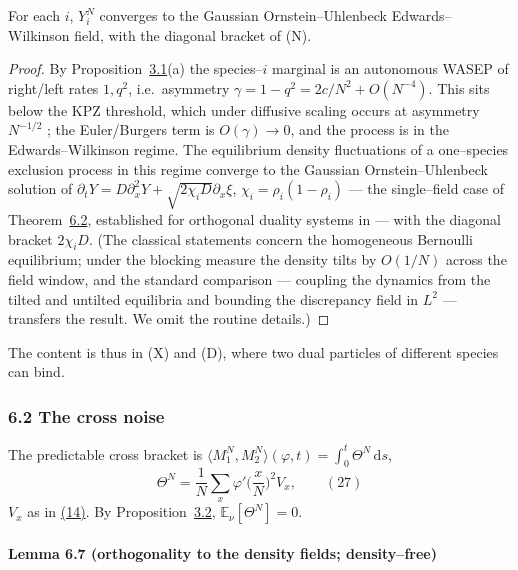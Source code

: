 \documentclass[11pt]{article}
\theoremstyle{plain}
\theoremstyle{definition}
\theoremstyle{remark}
\newcommand{\E}{\mathbb{E}}\newcommand{\PP}{\mathbb{P}}\newcommand{\dd}{\,\mathrm{d}}
\begin{document}
For each $i$, $Y_i^N$ converges to the Gaussian Ornstein--Uhlenbeck
Edwards--Wilkinson field, with the diagonal bracket of \textup{(N)}.
\par
\begin{proof}
By Proposition~\hyperref[prop_decouple]{3.1}(a) the species--$i$ marginal is an autonomous WASEP
of right/left rates $1,q^2$, i.e.\ asymmetry $\gamma=1-q^2=2c/N^2+O(N^{-4})$. This sits
below the KPZ threshold, which under diffusive scaling occurs at asymmetry $N^{-1/2}$
\cite{GJ}; the Euler/Burgers term is $O(\gamma)\to0$, and the process is in the
Edwards--Wilkinson regime. The equilibrium density fluctuations of a one--species
exclusion process in this regime converge to the Gaussian Ornstein--Uhlenbeck solution
of $\partial_tY=D\partial_x^2Y+\sqrt{2\chi_i D}\partial_x\xi$, $\chi_i=\rho_i(1-\rho_i)$
--- the single--field case of Theorem~\hyperref[thm_mp]{6.2}, established for orthogonal duality
systems in \cite{ACR2} --- with the diagonal bracket $2\chi_i D$. (The classical statements concern the homogeneous Bernoulli equilibrium;
under the blocking measure the density tilts by $O(1/N)$ across the field window, and
the standard comparison --- coupling the dynamics from the tilted and untilted
equilibria and bounding the discrepancy field in $L^2$ --- transfers the result. We
omit the routine details.)
\end{proof}

\noindent The content is thus in (X) and (D), where two dual particles of different
species can bind.

\subsubsection{6.2 The cross noise}
The predictable cross bracket is $\langle M_1^N,M_2^N\rangle(\varphi,t)=\int_0^t\Theta^N\dd s$,
\label{eq_Theta}
\begin{equation}
  \Theta^N=\frac1N\sum_x\varphi'\Big(\frac xN\Big)^2 V_x,\qquad(27)
\end{equation}
$V_x$ as in \hyperref[eq_Vdef]{(14)}. By Proposition~\hyperref[prop_cross]{3.2}, $\E_\nu[\Theta^N]=0$.

\paragraph{Lemma 6.7 (orthogonality to the density fields; density--free)}\label{lem_orth}
\end{document}
